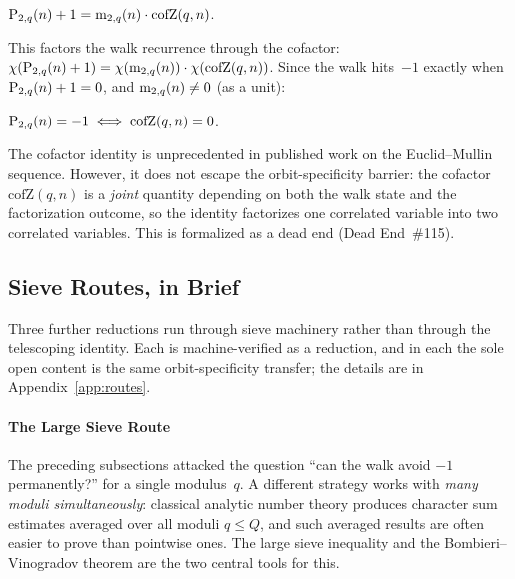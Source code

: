 \begin{theorem}
\label{thm:cofactor}
$\mathrm{P}_{2,q}(n) + 1 = \mathrm{m}_{2,q}(n) \cdot \mathrm{cofZ}(q, n)$.
\end{theorem}

This factors the walk recurrence through the cofactor:
$\chi(\mathrm{P}_{2,q}(n) + 1) = \chi(\mathrm{m}_{2,q}(n)) \cdot \chi(\mathrm{cofZ}(q,n))$.
Since the walk hits~$-1$ exactly when $\mathrm{P}_{2,q}(n) + 1 = 0$, and
$\mathrm{m}_{2,q}(n) \neq 0$ (as a unit):

\begin{theorem}
$\mathrm{P}_{2,q}(n) = -1 \;\Longleftrightarrow\; \mathrm{cofZ}(q, n) = 0$.
\end{theorem}

The cofactor identity is unprecedented in published work on the
Euclid--Mullin sequence.  However, it does not escape the orbit-specificity
barrier: the cofactor $\mathrm{cofZ}(q, n)$ is a \emph{joint} quantity
depending on both the walk state and the factorization outcome, so the
identity factorizes one correlated variable into two correlated
variables.  This is formalized as a dead end (Dead End~\#115).

\subsection{Sieve Routes, in Brief}
\label{sec:sieve-routes}

Three further reductions run through sieve machinery rather than through
the telescoping identity.  Each is machine-verified as a reduction, and in
each the sole open content is the same orbit-specificity transfer; the
details are in Appendix~\ref{app:routes}.

\paragraph{The Large Sieve Route}
\label{sec:large-sieve}

The preceding subsections attacked the question ``can the walk avoid
$-1$ permanently?'' for a single modulus~$q$.  A different strategy
works with \emph{many moduli simultaneously}: classical analytic
number theory produces character sum estimates averaged over all
moduli $q \leq Q$, and such averaged results are often easier to
prove than pointwise ones.  The large sieve inequality and the
Bombieri--Vinogradov theorem are the two central tools for this.

